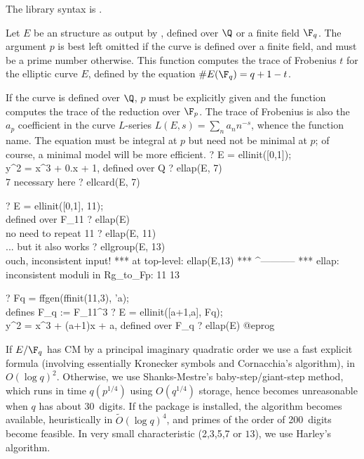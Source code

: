 The library syntax is .

\label{se:ellap}
Let $E$ be an  structure as output by , defined over
$\Q$ or a finite field $\F_q$. The argument $p$ is best left omitted if the
curve is defined over a finite field, and must be a prime number otherwise.
This function computes the trace of Frobenius $t$ for the elliptic curve $E$,
defined by the equation $\#E(\F_q) = q+1 - t$.

If the curve is defined over $\Q$, $p$ must be explicitly given and the
function computes the trace of the reduction over $\F_p$.
The trace of Frobenius is also the $a_p$ coefficient in the curve $L$-series
$L(E,s) = \sum_n a_n n^{-s}$, whence the function name. The equation must be
integral at $p$ but need not be minimal at $p$; of course, a minimal model
will be more efficient.
\bprog
? E = ellinit([0,1]);  \\ y^2 = x^3 + 0.x + 1, defined over Q
? ellap(E, 7) \\ 7 necessary here
? ellcard(E, 7)

? E = ellinit([0,1], 11);  \\ defined over F_11
? ellap(E)       \\ no need to repeat 11
? ellap(E, 11)   \\ ... but it also works
? ellgroup(E, 13) \\ ouch, inconsistent input!
   ***   at top-level: ellap(E,13)
   ***                 ^-----------
   *** ellap: inconsistent moduli in Rg_to_Fp:
     11
     13

? Fq = ffgen(ffinit(11,3), 'a); \\ defines F_q := F_{11^3}
? E = ellinit([a+1,a], Fq);  \\ y^2 = x^3 + (a+1)x + a, defined over F_q
? ellap(E)
@eprog

 If $E/\F_q$ has CM by a principal imaginary
quadratic order we use a fast explicit formula (involving essentially Kronecker
symbols and Cornacchia's algorithm), in $O(\log q)^2$.
Otherwise, we use Shanks-Mestre's baby-step/giant-step method, which runs in
time $q(p^{1/4})$ using $O(q^{1/4})$ storage, hence becomes unreasonable when
$q$ has about 30~digits. If the  package is installed, the
 algorithm becomes available, heuristically in $\tilde{O}(\log
q)^4$, and primes of the order of 200~digits become feasible. In very small
characteristic (2,3,5,7 or $13$), we use Harley's algorithm.

